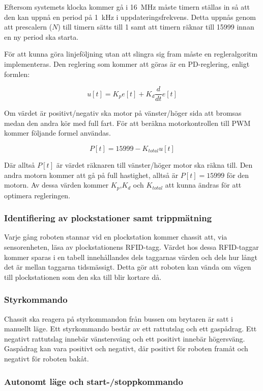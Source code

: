 Eftersom systemets klocka kommer gå i 16~MHz måste timern ställas in så att den kan uppnå en period på 1~kHz i uppdateringsfrekvens. Detta uppnås genom att prescalern ($N$) till timern sätts till 1 samt att timern räknar till 15999 innan en ny period ska starta. 

För att kunna göra linjeföljning utan att slingra sig fram måste en regleralgoritm implementeras. Den reglering som kommer att göras är en PD-reglering, enligt formlen:

$$u[t] = K_{p}e[t] + K_{d}\frac{d}{dt}e[t]$$

Om värdet är positivt/negativ ska motor på vänster/höger sida att bromsas medan den andra kör med full fart. För att beräkna motorkontrollen till PWM kommer följande formel användas.

$$P[t] = 15999 - K_{total}u[t]$$

Där alltså $P[t]$ är värdet räknaren till vänster/höger motor ska räkna till. Den andra motorn kommer att gå på full hastighet, alltså är $P[t] = 15999$ för den motorn. Av dessa värden kommer $K_{p}$,$K_{d}$ och $K_{total}$ att kunna ändras för att optimera regleringen.


\subsubsection{Identifiering av plockstationer samt trippmätning}

Varje gång roboten stannar vid en plockstation kommer chassit att, via sensorenheten, läsa av plockstationens RFID-tagg. Värdet hos dessa RFID-taggar kommer sparas i en tabell innehållandes dels taggarnas värden och dels hur långt det är mellan taggarna tidsmässigt. Detta gör att roboten kan vända om vägen till plockstationen som den ska till blir kortare då.


\subsubsection{Styrkommando}

Chassit ska reagera på styrkommandon från bussen om brytaren är satt i manuellt läge. Ett styrkommando består av ett rattutslag och ett gaspådrag. Ett negativt rattutslag innebär vänstersväng och ett positivt innebär högersväng. Gaspådrag kan vara positivt och negativt, där positivt för roboten framåt och negativt för roboten bakåt. 


\subsubsection{Autonomt läge och start-/stoppkommando}


